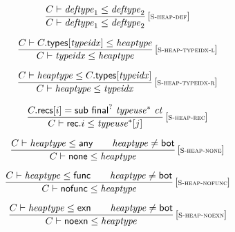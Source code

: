 $$
\begin{array}{@{}c@{}}\displaystyle
\frac{
C \vdash {\mathit{deftype}}_1 \leq {\mathit{deftype}}_2
}{
C \vdash {\mathit{deftype}}_1 \leq {\mathit{deftype}}_2
} \, {[\textsc{\scriptsize S{-}heap{-}def}]}
\qquad
\end{array}
$$

$$
\begin{array}{@{}c@{}}\displaystyle
\frac{
C \vdash C{.}\mathsf{types}{}[{\mathit{typeidx}}] \leq {\mathit{heaptype}}
}{
C \vdash {\mathit{typeidx}} \leq {\mathit{heaptype}}
} \, {[\textsc{\scriptsize S{-}heap{-}typeidx{-}l}]}
\qquad
\end{array}
$$

$$
\begin{array}{@{}c@{}}\displaystyle
\frac{
C \vdash {\mathit{heaptype}} \leq C{.}\mathsf{types}{}[{\mathit{typeidx}}]
}{
C \vdash {\mathit{heaptype}} \leq {\mathit{typeidx}}
} \, {[\textsc{\scriptsize S{-}heap{-}typeidx{-}r}]}
\qquad
\end{array}
$$

$$
\begin{array}{@{}c@{}}\displaystyle
\frac{
C{.}\mathsf{recs}{}[i] = \mathsf{sub}~{\mathsf{final}^?}~{{\mathit{typeuse}}^\ast}~{\mathit{ct}}
}{
C \vdash \mathsf{rec} {.} i \leq {{\mathit{typeuse}}^\ast}{}[j]
} \, {[\textsc{\scriptsize S{-}heap{-}rec}]}
\qquad
\end{array}
$$

$$
\begin{array}{@{}c@{}}\displaystyle
\frac{
C \vdash {\mathit{heaptype}} \leq \mathsf{any}
 \qquad
{\mathit{heaptype}} \neq \mathsf{bot}
}{
C \vdash \mathsf{none} \leq {\mathit{heaptype}}
} \, {[\textsc{\scriptsize S{-}heap{-}none}]}
\qquad
\end{array}
$$

$$
\begin{array}{@{}c@{}}\displaystyle
\frac{
C \vdash {\mathit{heaptype}} \leq \mathsf{func}
 \qquad
{\mathit{heaptype}} \neq \mathsf{bot}
}{
C \vdash \mathsf{nofunc} \leq {\mathit{heaptype}}
} \, {[\textsc{\scriptsize S{-}heap{-}nofunc}]}
\qquad
\end{array}
$$

$$
\begin{array}{@{}c@{}}\displaystyle
\frac{
C \vdash {\mathit{heaptype}} \leq \mathsf{exn}
 \qquad
{\mathit{heaptype}} \neq \mathsf{bot}
}{
C \vdash \mathsf{noexn} \leq {\mathit{heaptype}}
} \, {[\textsc{\scriptsize S{-}heap{-}noexn}]}
\qquad
\end{array}
$$

